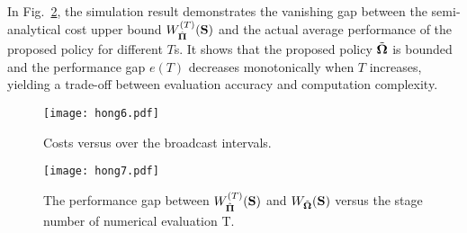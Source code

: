 In Fig.~\ref{fig:semi-bound}, the simulation result demonstrates the vanishing gap between the semi-analytical cost upper bound $W^{(T)}_{\hat{\boldsymbol{\Pi}}}(\mathbf{S})$ and the actual average performance of the proposed policy for different $T$s.
It shows that the proposed policy $\tilde{\boldsymbol{\Omega}}$ is bounded and the performance gap $e(T)$ decreases monotonically when $T$ increases, yielding a trade-off between evaluation accuracy and computation complexity.

\begin{figure}[ht!]                                                                             %
    \centering                                                                                  %
    \texttt{[image: hong6.pdf]}                     %
    \caption{Costs versus over the broadcast intervals.}
    \label{fig:general_timeline}                                                                %
\end{figure}                                                                                    %

\begin{figure}[ht!]                                                                             %
    \centering                                                                                  %
    \texttt{[image: hong7.pdf]}                     %
    \caption{The performance gap between $W^{(T)}_{\hat{\boldsymbol{\Pi}}}(\mathbf{S})$ and $W_{\tilde{\boldsymbol{\Omega}}}(\mathbf{S})$ versus the stage number of numerical evaluation T.}
    \label{fig:semi-bound}                                                                %
\end{figure}                                                                                    %

